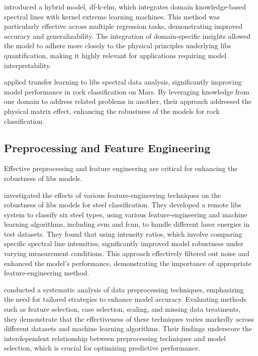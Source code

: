 \citet{song_DF-K-ELM} introduced a hybrid model, \gls{df}-\gls{k-elm}, which integrates domain knowledge-based spectral lines with kernel extreme learning machines.
This method was particularly effective across multiple regression tasks, demonstrating improved accuracy and generalizability.
The integration of domain-specific insights allowed the model to adhere more closely to the physical principles underlying \gls{libs} quantification, making it highly relevant for applications requiring model interpretability.

\citet{sunMachineLearningTransfer2021} applied transfer learning to \gls{libs} spectral data analysis, significantly improving model performance in rock classification on Mars.
By leveraging knowledge from one domain to address related problems in another, their approach addressed the physical matrix effect, enhancing the robustness of the models for rock classification.

\subsection{Preprocessing and Feature Engineering}
Effective preprocessing and feature engineering are critical for enhancing the robustness of \gls{libs} models.

\citet{jeonEffectsFeatureEngineering2024} investigated the effects of various feature-engineering techniques on the robustness of \gls{libs} models for steel classification.
They developed a remote \gls{libs} system to classify six steel types, using various feature-engineering and machine learning algorithms, including \gls{svm} and \gls{fcnn}, to handle different laser energies in test datasets.
They found that using intensity ratios, which involve comparing specific spectral line intensities, significantly improved model robustness under varying measurement conditions.
This approach effectively filtered out noise and enhanced the model's performance, demonstrating the importance of appropriate feature-engineering method.

\citet{Huang2015AnEA} conducted a systematic analysis of data preprocessing techniques, emphasizing the need for tailored strategies to enhance model accuracy.
Evaluating methods such as feature selection, case selection, scaling, and missing data treatments, they demonstrate that the effectiveness of these techniques varies markedly across different datasets and machine learning algorithms.
Their findings underscore the interdependent relationship between preprocessing techniques and model selection, which is crucial for optimizing predictive performance.

